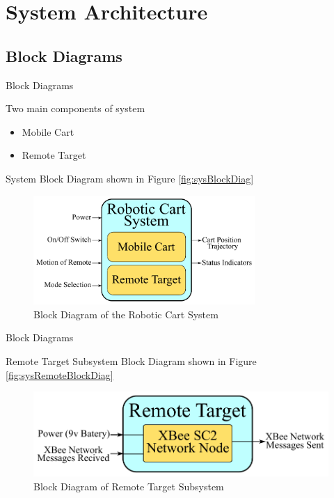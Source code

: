 \documentclass{beamer}
\begin{document}

\section{System Architecture}
\subsection{Block Diagrams}
\begin{frame}{Block Diagrams}
  \begin{block}{}
    Two main components of system
    \begin{itemize}
      \item Mobile Cart
      \item Remote Target
    \end{itemize}
    System Block Diagram shown in Figure \autoref{fig:sysBlockDiag}
\end{block}
  \begin{figure}[b]
    \centering
    \includegraphics[width=0.75\textwidth]{figs/system_block_diagram_2}
    \caption{Block Diagram of the Robotic Cart System}
    \label{fig:sysBlockDiag}
  \end{figure}
\end{frame}

\begin{frame}{Block Diagrams}
  \begin{block}{}
    Remote Target Subsystem Block Diagram shown in Figure \autoref{fig:sysRemoteBlockDiag}
  \end{block}
  \begin{figure}[b]
    \centering
    \includegraphics[width=\textwidth]{figs/remote_target_block_diagram}
    \caption{Block Diagram of Remote Target Subsystem}
    \label{fig:sysRemoteBlockDiag}
  \end{figure}
\end{frame}
\end{document}
